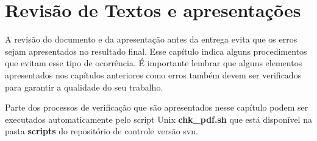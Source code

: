\chapter{Revisão de Textos e apresentações}
\label{revisao-de-textos}


A revisão do documento e da apresentação antes da entrega evita que os erros sejam apresentados no resultado final. Esse capítulo indica alguns procedimentos que evitam esse tipo de ocorrência. É importante lembrar que alguns elementos apresentados nos capítulos anteriores como erros também devem ser verificados para garantir a qualidade do seu trabalho.

Parte dos processos de verificação que são apresentados nesse capítulo podem ser executados automaticamente pelo script Unix \textbf{chk\_pdf.sh} que está disponível na pasta \textbf{scripts} do repositório de controle versão \ac{svn}.


